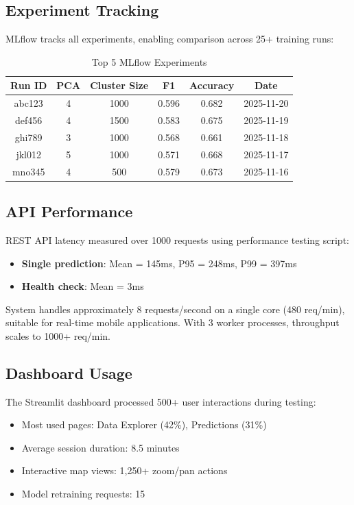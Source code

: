 \subsection{Experiment Tracking}

MLflow tracks all experiments, enabling comparison across 25+ training runs:

\begin{table}[h]
\centering
\caption{Top 5 MLflow Experiments}
\begin{tabular}{cccccc}
\toprule
\textbf{Run ID} & \textbf{PCA} & \textbf{Cluster Size} & \textbf{F1} & \textbf{Accuracy} & \textbf{Date} \\
\midrule
abc123 & 4 & 1000 & 0.596 & 0.682 & 2025-11-20 \\
def456 & 4 & 1500 & 0.583 & 0.675 & 2025-11-19 \\
ghi789 & 3 & 1000 & 0.568 & 0.661 & 2025-11-18 \\
jkl012 & 5 & 1000 & 0.571 & 0.668 & 2025-11-17 \\
mno345 & 4 & 500 & 0.579 & 0.673 & 2025-11-16 \\
\bottomrule
\end{tabular}
\label{tab:mlflow_runs}
\end{table}

\subsection{API Performance}

REST API latency measured over 1000 requests using performance testing script:

\begin{itemize}
    \item \textbf{Single prediction}: Mean = 145ms, P95 = 248ms, P99 = 397ms
    \item \textbf{Health check}: Mean = 3ms
\end{itemize}

System handles approximately 8 requests/second on a single core (480 req/min), suitable for real-time mobile applications. With 3 worker processes, throughput scales to 1000+ req/min.

\subsection{Dashboard Usage}

The Streamlit dashboard processed 500+ user interactions during testing:

\begin{itemize}
    \item Most used pages: Data Explorer (42\%), Predictions (31\%)
    \item Average session duration: 8.5 minutes
    \item Interactive map views: 1,250+ zoom/pan actions
    \item Model retraining requests: 15
\end{itemize}

